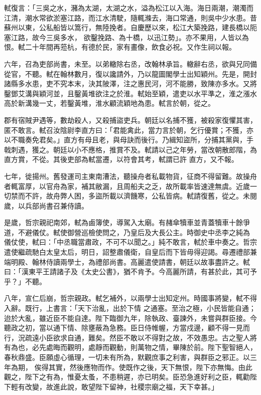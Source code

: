 \begin{pinyinscope}
 軾復言：「三吳之水，瀦為太湖，太湖之水，溢為松江以入海。海日兩潮，潮濁而江清，潮水常欲淤塞江路，而江水清駛，隨輒滌去，海口常通，則吳中少水患。昔蘇州以東，公私船皆以篙行，無陸挽者。自慶歷以來，松江大築挽路，建長橋以阨塞江路，故今三吳多水，
 欲鑿挽路、為十橋，以迅江勢」。亦不果用，人皆以為恨。軾二十年間再蒞杭，有德於民，家有畫像，飲食必祝。又作生祠以報。



 六年，召為吏部尚書，未至。以弟轍除右丞，改翰林承旨。轍辭右丞，欲與兄同備從官，不聽。軾在翰林數月，復以讒請外，乃以龍圖閣學士出知穎州。先是，開封諸縣多水患，吏不究本末，決其陂澤，注之惠民河，河不能勝，致陳亦多水。又將鑿鄧艾溝與穎河並，且鑿黃堆欲注之於淮。軾始至穎，遣吏以水平準之，淮之漲水
 高於新溝幾一丈，若鑿黃堆，淮水顧流穎地為患。軾言於朝，從之。



 郡有宿賊尹遇等，數劫殺人，又殺捕盜吏兵。朝廷以名捕不獲，被殺家復懼其害，匿不敢言。軾召汝陰尉李直方曰：「君能禽此，當力言於朝，乞行優賞；不獲，亦以不職奏免君矣。」直方有母且老，與母訣而後行。乃緝知盜所，分捕其黨與，手戟刺遇，獲之。朝廷以小不應格，推賞不及。軾請以己之年勞，當改朝散郎階，為直方賞，不從。其後吏部為軾當遷，以符會其考，軾謂已許
 直方，又不報。



 七年，徙揚州。舊發運司主東南漕法，聽操舟者私載物貨，征商不得留難。故操舟者輒富厚，以官舟為家，補其敝漏，且周船夫之乏，故所載率皆速達無虞。近歲一切禁而不許，故舟弊人困，多盜所載以濟饑寒，公私皆病。軾請復舊，從之。未閱歲，以兵部尚書召兼侍讀。



 是歲，哲宗親祀南郊，軾為鹵簿使，導駕入太廟。有赭傘犢車並青蓋犢車十餘爭道，不避儀仗。軾使御營巡檢使問之，乃皇后及大長公主。時御史中丞李之純為
 儀仗使，軾曰：「中丞職當肅政，不可不以聞之。」純不敢言，軾於車中奏之。哲宗遣使繼疏馳白太皇太后，明日，詔整肅儀衛，自皇后而下皆毋得迎謁。尋遷禮部兼端明殿、翰林侍讀兩學士，為禮部尚書。高麗遣使請書，朝廷以故事盡許之。軾曰：「漢東平王請諸子及《太史公書》，猶不肯予。今高麗所請，有甚於此，其可予乎？」不聽。



 八年，宣仁后崩，哲宗親政。軾乞補外，以兩學士出知定州。時國事將變，軾不得入辭。既行，上書言：「天下治亂，出於下情
 之通塞。至治之極，小民皆能自通；迨於大亂，雖近臣不能自達。陛下臨御九年，除執政、臺諫外，未嘗與群臣接。今聽政之初，當以通下情、除壅蔽為急務。臣日侍帷幄，方當戍邊，顧不得一見而行，況疏遠小臣欲求自通，難矣。然臣不敢以不得對之故，不效愚忠。古之聖人將有為也，必先處晦而觀明，處靜而觀動，則萬物之情，畢陳於前。陛下聖智絕人，春秋鼎盛。臣願虛心循理，一切未有所為，默觀庶事之利害，與群臣之邪正。以三年為期，
 俟得其實，然後應物而作。使既作之後，天下無恨，陛下亦無悔。由此觀之，陛下之有為，惟憂太蚤，不患稍遲，亦已明矣。臣恐急進好利之臣，輒勸陛下輕有改變，故進此說，敢望陛下留神，社稷宗廟之福，天下幸甚。」




\end{pinyinscope}
